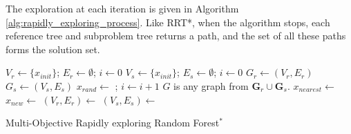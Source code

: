 \documentclass{article}
\begin{document}
The exploration at each iteration is given in Algorithm \ref{alg:rapidly_exploring_process}.  Like RRT*, when the algorithm stops, each reference tree and subproblem tree returns a path, and the set of all these paths forms the solution set.

\begin{algorithm}
	\begin{algorithmic}[1]
		\State $ V_{r} \leftarrow \{ x_{init} \} $; $ E_{r} \leftarrow \emptyset $; $ i \leftarrow 0 $
		\EndFor
		\State $ V_{s} \leftarrow \{ x_{init} \} $; $ E_{s} \leftarrow \emptyset $; $ i \leftarrow 0 $
		\EndFor
		\State $ G_{r} \leftarrow (V_{r}, E_{r}) $
		\EndFor
		\State $ G_{s} \leftarrow (V_{s}, E_{s}) $
		\EndFor
		\State $ x_{rand} \leftarrow $  ; $ i \leftarrow i + 1 $
		\State $G$ is any graph from ${\mathbf G}_r\cup {\mathbf G}_s$.
		\State $ x_{nearest} \leftarrow $ 
		\State $ x_{new} \leftarrow $ 
		\State $ (V_{r}, E_{r}) \leftarrow $ 
		\EndFor
		\State $ (V_{s}, E_{s}) \leftarrow $ 
		\EndFor
		\EndIf
		\EndWhile
	\end{algorithmic}
	\caption{Multi-Objective Rapidly exploring Random Forest$^{*}$ }
	\label{alg:rapidly_exploring_process}
\end{algorithm}
\end{document}
